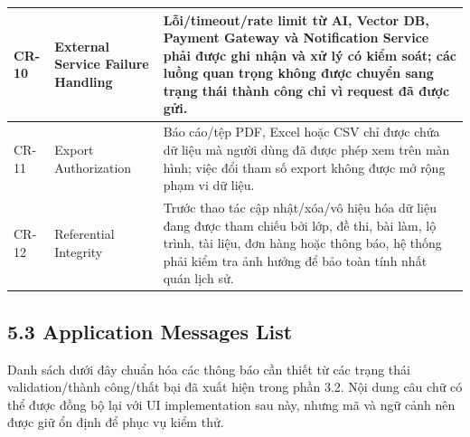 \documentclass[12pt,a4paper,oneside]{report}
\begin{document}
\begin{longtable}{|p{1.6cm}|p{3.2cm}|p{9.2cm}|}
CR-10 & External Service Failure Handling & Lỗi/timeout/rate limit từ AI, Vector DB, Payment Gateway và Notification Service phải được ghi nhận và xử lý có kiểm soát; các luồng quan trọng không được chuyển sang trạng thái thành công chỉ vì request đã được gửi. \\ \hline
CR-11 & Export Authorization & Báo cáo/tệp PDF, Excel hoặc CSV chỉ được chứa dữ liệu mà người dùng đã được phép xem trên màn hình; việc đổi tham số export không được mở rộng phạm vi dữ liệu. \\ \hline
CR-12 & Referential Integrity & Trước thao tác cập nhật/xóa/vô hiệu hóa dữ liệu đang được tham chiếu bởi lớp, đề thi, bài làm, lộ trình, tài liệu, đơn hàng hoặc thông báo, hệ thống phải kiểm tra ảnh hưởng để bảo toàn tính nhất quán lịch sử. \\ \hline
\end{longtable}

\subsection*{5.3 Application Messages List}

Danh sách dưới đây chuẩn hóa các thông báo cần thiết từ các trạng thái validation/thành công/thất bại đã xuất hiện trong phần 3.2. Nội dung câu chữ có thể được đồng bộ lại với UI implementation sau này, nhưng mã và ngữ cảnh nên được giữ ổn định để phục vụ kiểm thử.
\end{document}
